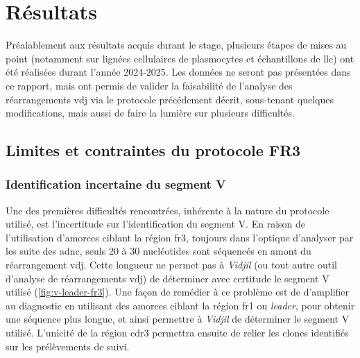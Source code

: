 \chapter{Résultats}

Préalablement aux résultats acquis durant le stage, plusieurs étapes de mises au point (notamment sur lignées cellulaires de plasmocytes et 
échantillons de \gls{llc}) ont été réalisées durant l'année 2024-2025. Les données ne seront pas présentées dans ce rapport, mais ont permis 
de valider la faisabilité de l'analyse des réarrangements \gls{vdj} via le protocole précédement décrit, sous-tenant quelques modifications, 
mais aussi de faire la lumière sur plusieurs difficultés.

\section{Limites et contraintes du protocole FR3}

\subsection{Identification incertaine du segment V}

Une des premières difficultés rencontrées, inhérente à la nature du protocole utilisé, est l'incertitude sur l'identification 
du segment V. En raison de l'utilisation d'amorces ciblant la région \gls{fr}3, toujours dans l'optique d'analyser par les suite 
des \gls{adnc}, seuls 20 à 30 nucléotides sont séquencés en amont du réarrangement \gls{vdj}. Cette longueur ne permet pas à 
\textit{Vidjil} (ou tout autre outil d'analyse de réarrangements \gls{vdj}) de déterminer avec certitude le segment V utilisé 
(\autoref{fig:v-leader-fr3}). 
Une façon de remédier à ce problème est de d'amplifier au diagnostic en utilisant des amorces ciblant la région \gls{fr}1 ou 
\textit{leader}, pour obtenir une séquence plus longue, et ainsi permettre à \textit{Vidjil} de déterminer le segment V utilisé. 
L'unicité de la région \gls{cdr}3 permettra ensuite de relier les clones identifiés sur les prélèvements de suivi.

